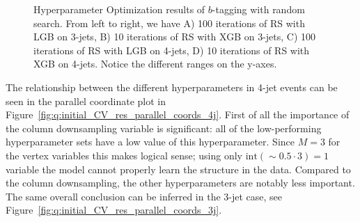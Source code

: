 \begin{figure}%
  \centering
  \;
  \vspace{2mm}
  \caption[Hyperparameter Optimization of $b$-tagging]{
    Hyperparameter Optimization results of $b$-tagging with random search. From left to right, we have A) \num{100} iterations of RS with LGB on 3-jets, B) \num{10} iterations of RS with XGB on 3-jets, C) \num{100} iterations of RS with LGB on 4-jets, D) \num{10} iterations of RS with XGB on 4-jets. Notice the different ranges on the y-axes.}
  \label{fig:q:CV_res_iterations_b_tagging}%
\end{figure}
\vspace{0.5cm}

The relationship between the different hyperparameters in 4-jet events can be seen in the parallel coordinate plot in Figure~\ref{fig:q:initial_CV_res_parallel_coords_4j}. First of all the importance of the column downsampling  variable is significant: all of the low-performing hyperparameter sets have a low value of this hyperparameter. Since $M=3$ for the vertex variables this makes logical sense; using only $\mathrm{int}(\sim 0.5 \cdot 3) = 1$ variable the model cannot properly learn the structure in the data. Compared to the column downsampling, the other hyperparameters are notably less important. The same overall conclusion can be inferred in the 3-jet case, see Figure~\ref{fig:q:initial_CV_res_parallel_coords_3j}.

